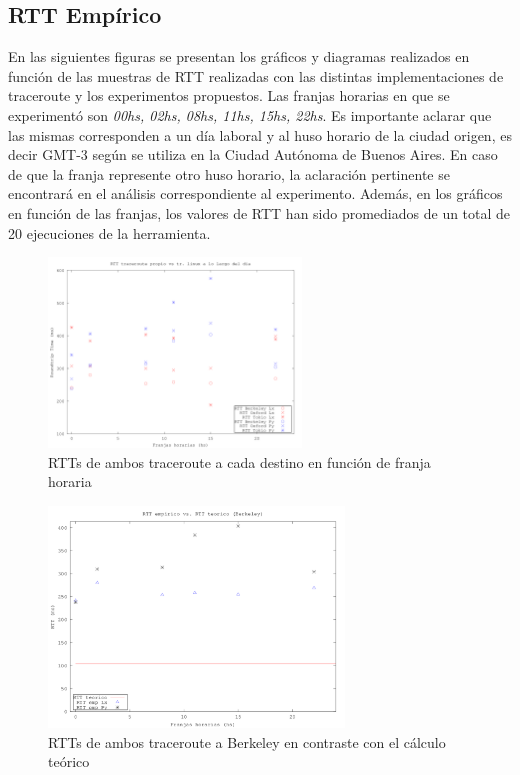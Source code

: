 \subsection{RTT Empírico}

En las siguientes figuras se presentan los gráficos y diagramas realizados en función de las muestras de RTT realizadas con las distintas implementaciones de traceroute y los experimentos propuestos. Las franjas horarias en que se experimentó son \textsl{00hs, 02hs, 08hs, 11hs, 15hs, 22hs}. Es importante aclarar que las mismas corresponden a un día laboral y al huso horario de la ciudad origen, es decir GMT-3 según se utiliza en la Ciudad Autónoma de Buenos Aires. En caso de que la franja represente otro huso horario, la aclaración pertinente se encontrará en el análisis correspondiente al experimento. Además, en los gráficos en función de las franjas, los valores de RTT han sido promediados de un total de 20 ejecuciones de la herramienta.

\begin{figure}[h!]
  \centering
  \includegraphics[width=0.6\textwidth]{./figs/franjasTR_py_vs_linux.png}
  \caption{RTTs de ambos traceroute a cada destino en función de franja horaria}
  \label{fig:frajasTR_py_lin}
\end{figure}

\clearpage

\begin{figure}[h!]
  \centering
  \includegraphics[width=0.7\textwidth]{./figs/rtt_emp_vs_teo_berkeley.png}
  \caption{RTTs de ambos traceroute a Berkeley en contraste con el cálculo teórico}
  \label{fig:emp_vs_teo_berk}
\end{figure}

